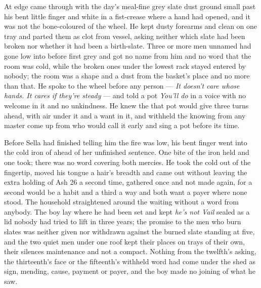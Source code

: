 \scenebreak

At  edge  came through  with the day's meal-fine grey slate dust ground small past his bent little finger and white in a fist-crease where a hand had opened, and it was not the bone-coloured  of the wheel. He kept dusty forearms and clean on one tray and parted them as clot from vessel, asking neither which slate had been broken nor whether it had been a birth-slate. Three or more men unnamed had gone low into  before first grey and got no name from him and no word that the room was cold, while the broken ones under the lowest rack stayed entered by nobody; the room was a shape and a dust from the basket's place and no more than that. He spoke to the wheel before any person --- \emph{It doesn't care whose hands. It cares if they're steady} --- and told a pot \emph{You'll do} in a voice with no welcome in it and no unkindness. He knew the  that pot would give three turns ahead, with air under it and a want in it, and withheld the knowing from any master come up from  who would call it early and sing a pot before its time.

Before Sella had finished telling him the fire was low, his bent finger went into the cold iron of  ahead of her unfinished sentence. One bite of the iron held and one took; there was no  word covering both mercies. He took the cold out of the fingertip, moved his tongue a hair's breadth and came out without leaving the extra holding of Ash 26 a second time, gathered once and not made again, for a second would be a habit and a third a way and both want a payer where none stood. The household straightened around the waiting without a word from anybody. The boy lay where he had been set and kept \emph{he's not Vail} sealed as a lid nobody had tried to lift in three years; the promise to the men who burn slates was neither given nor withdrawn against the burned slate standing at five, and the two quiet men under one roof kept their places on trays of their own, their silences maintenance and not a compact. Nothing from the twelfth's asking, the thirteenth's face or the fifteenth's withheld word had come under the shed as sign, mending, cause, payment or payer, and the boy made no joining of what he saw.

\scenebreak

